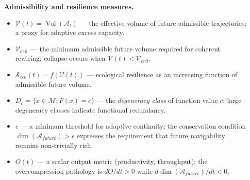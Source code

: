 \documentclass[11pt,a4paper]{article}
\newcommand{\Aspace}{\mathcal{A}}
\newcommand{\Mspace}{\mathcal{M}}
\begin{document}
\medskip
\noindent\textbf{Admissibility and resilience measures.}
\begin{itemize}
  \item $\mathcal{V}(t)=\operatorname{Vol}(\Aspace_t)$ --- the effective volume of future admissible trajectories; a proxy for adaptive excess capacity.
  \item $\mathcal{V}_{crit}$ --- the minimum admissible future volume required for coherent rewiring; collapse occurs when $\mathcal{V}(t)<\mathcal{V}_{crit}$.
  \item $\mathcal{S}_{eco}(t)=f(\mathcal{V}(t))$ --- ecological resilience as an increasing function of admissible future volume.
  \item $D_c=\{x\in\Mspace:F(x)=c\}$ --- the \emph{degeneracy class} of function value $c$; large degeneracy classes indicate functional redundancy.
  \item $\epsilon$ --- a minimum threshold for adaptive continuity; the conservation condition $\dim(\Aspace_{future})>\epsilon$ expresses the requirement that future navigability remains non-trivially rich.
  \item $O(t)$ --- a scalar output metric (productivity, throughput); the overcompression pathology is $dO/dt>0$ while $d\dim(\Aspace_{future})/dt<0$.
\end{itemize}
\end{document}
